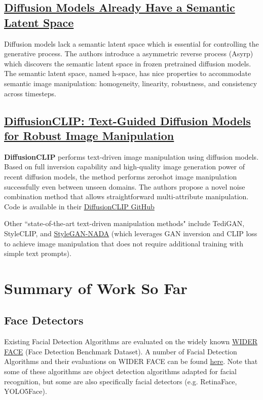 \documentclass[12pt]{amsart}
\begin{document}
\subsection{\href{https://openreview.net/pdf?id=pd1P2eUBVfq}{Diffusion Models Already Have a Semantic Latent Space}}

\begin{approach*}
Diffusion models lack a semantic latent space which is essential for controlling the generative process. The authors introduce a asymmetric reverse process (Asyrp) which discovers the semantic latent space in frozen pretrained diffusion models. The semantic latent space, named h-space, has nice properties to accommodate semantic image manipulation: homogeneity, linearity, robustness, and consistency across timesteps.
\end{approach*}

\subsection{\href{https://arxiv.org/pdf/2110.02711.pdf}{DiffusionCLIP: Text-Guided Diffusion Models for Robust Image Manipulation}}

\begin{approach*}
\textbf{DiffusionCLIP} performs text-driven image manipulation using diffusion models. Based on
full inversion capability and high-quality image generation power of recent diffusion models, the method performs zeroshot image manipulation successfully even between unseen domains. The authors propose a novel noise combination
method that allows straightforward multi-attribute manipulation. Code is available in their
\href{https://github.com/gwang-kim/DiffusionCLIP.git}{DiffusionCLIP GitHub}
\end{approach*}

Other ``state-of-the-art text-driven manipulation methods" include TediGAN, StyleCLIP, and \href{https://arxiv.org/pdf/2108.00946.pdf}{StyleGAN-NADA} (which leverages GAN inversion and CLIP loss to achieve image manipulation that does not require additional training with simple text prompts).

\newpage

\section{Summary of Work So Far}

\subsection{Face Detectors}

Existing Facial Detection Algorithms are evaluated on the widely known \href{http://shuoyang1213.me/WIDERFACE/index.html}
{WIDER FACE} (Face Detection Benchmark Dataset). A number of Facial Detection Algorithms and their evaluations on WIDER FACE can be found \href{http://shuoyang1213.me/WIDERFACE/WiderFace_Results.html}{here}. Note that some of these algorithms are object detection algorithms adapted for facial recognition, but some are also specifically facial detectors (e.g. RetinaFace, YOLO5Face).
\end{document}
